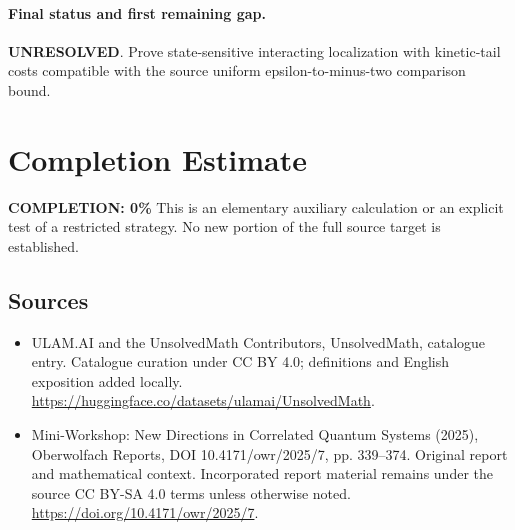 \documentclass[11pt]{article}
\begin{document}
\paragraph{Final status and first remaining gap.}
\textbf{UNRESOLVED}. Prove state-sensitive interacting localization with kinetic-tail costs compatible with the source uniform epsilon-to-minus-two comparison bound.

\section{Completion Estimate}
\noindent\textbf{COMPLETION: 0\%}
This is an elementary auxiliary calculation or an explicit test of a restricted strategy. No new portion of the full source target is established.

\subsection{Sources}
\begin{itemize}
\item[\hypertarget{source:statement:1}{S1}] ULAM.AI and the UnsolvedMath Contributors, UnsolvedMath, catalogue entry. Catalogue curation under CC BY 4.0; definitions and English exposition added locally.
\url{https://huggingface.co/datasets/ulamai/UnsolvedMath}.
\item[\hypertarget{source:statement:2}{S2}] Mini-Workshop: New Directions in Correlated Quantum Systems (2025), Oberwolfach Reports, DOI 10.4171/owr/2025/7, pp. 339--374. Original report and mathematical context. Incorporated report material remains under the source CC BY-SA 4.0 terms unless otherwise noted.
\url{https://doi.org/10.4171/owr/2025/7}.
\end{itemize}
\label{end:statement}
\end{document}
